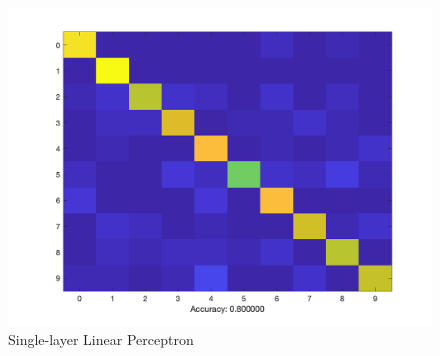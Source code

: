 \documentclass[letter, 11pt]{article}
\begin{document}
\begin{figure}[H]
        \includegraphics[width=1.1\textwidth]{HW4/RESULT/SLPLINEAR_CONFUSION.png}
    \endminipage\hfill
    \caption{Single-layer Linear Perceptron}
\end{figure}
\end{document}
